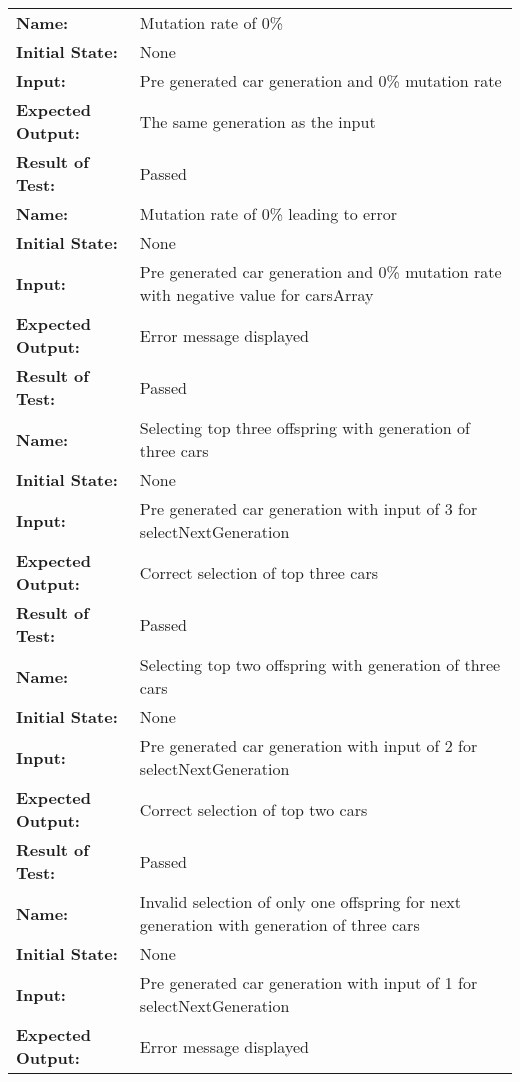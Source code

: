 \documentclass[12pt, titlepage]{article}
\begin{document}
\begin{center}
\begin{longtable}{ l | p{10cm} }
\hline
\rule{0pt}{1.5em}\textbf{Name:} & Mutation rate of 0\%\\
\textbf{Initial State:} & None\\
\textbf{Input:} & Pre generated car generation and 0\% mutation rate\\
\textbf{Expected Output:} & The same generation as the input\\[0.6em]
\textbf{Result of Test:} & Passed\\
\hline
\rule{0pt}{1.5em}\textbf{Name:} & Mutation rate of 0\% leading to error\\
\textbf{Initial State:} & None\\
\textbf{Input:} & Pre generated car generation and 0\% mutation rate with negative value for carsArray\\
\textbf{Expected Output:} & Error message displayed\\[0.6em]
\textbf{Result of Test:} & Passed\\
\hline
\rule{0pt}{1.5em}\textbf{Name:} & Selecting top three offspring with generation of three cars\\
\textbf{Initial State:} & None\\
\textbf{Input:} & Pre generated car generation with input of 3 for selectNextGeneration\\
\textbf{Expected Output:} & Correct selection of top three cars\\[0.6em]
\textbf{Result of Test:} & Passed\\
\hline
\rule{0pt}{1.5em}\textbf{Name:} & Selecting top two offspring with generation of three cars\\
\textbf{Initial State:} & None\\
\textbf{Input:} & Pre generated car generation with input of 2 for selectNextGeneration\\
\textbf{Expected Output:} & Correct selection of top two cars\\[0.6em]
\textbf{Result of Test:} & Passed\\
\hline
\rule{0pt}{1.5em}\textbf{Name:} & Invalid selection of only one offspring for next generation with generation of three cars\\
\textbf{Initial State:} & None\\
\textbf{Input:} & Pre generated car generation with input of 1 for selectNextGeneration\\
\textbf{Expected Output:} & Error message displayed\\[0.6em]

\end{longtable}
\end{center}
\end{document}
